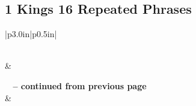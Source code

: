 \subsection{1 Kings 16 Repeated Phrases}


\normalsize
 
\begin{center}
\begin{longtable}{|p{3.0in}|p{0.5in}|}
\caption[1 Kings 16 Repeated Phrases]{1 Kings 16 Repeated Phrases}\label{table:Repeated Phrases 1 Kings 16} \\
\hline {} &  \\ \hline 
\endfirsthead
 
{{\bfseries \tablename\ \thetable{} -- continued from previous page}} \\  
\hline {} &  \\ \hline 
\endhead
 

\end{longtable}
\end{center}
